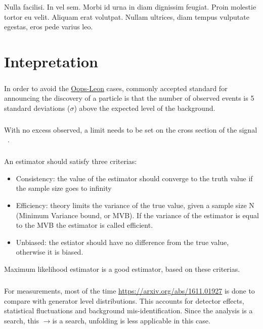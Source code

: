 \begin{savequote}[75mm]
Nulla facilisi. In vel sem. Morbi id urna in diam dignissim feugiat. Proin molestie tortor eu velit. Aliquam erat volutpat. Nullam ultrices, diam tempus vulputate egestas, eros pede varius leo.
\end{savequote}

\chapter{Intepretation}

\paragraph{}
In order to avoid the \href{https://en.wikipedia.org/wiki/Oops-Leon}{Oops-Leon} cases, commonly accepted standard for announcing the discovery of a particle is that the number of observed events is 5 standard deviations ($\sigma$) above the expected level of the background.

\paragraph{}
With no excess observed, a limit needs to be set on the cross section of the signal ~\cite{Stat-asym}. 

\paragraph{}
An estimator should satisfy three criterias:
\begin{itemize}
	\item Consistency: the value of the estimator should converge to the truth value if the sample size goes to infinity
	\item Efficiency: theory limits the variance of the true value, given a sample size N (Minimum Variance bound, or MVB). If the variance of the estimator is equal to the MVB the estimator is called efficient.
	\item Unbiased: the estiator should have no difference from the true value, otherwise it is biased.
\end{itemize}
Maximum likelihood estimator is a good estimator, based on these criterias.

\paragraph{}
For measurements, most of the time \href{unfolding}{https://arxiv.org/abs/1611.01927} is done to compare with generator level distributions. This accounts for detector effects, statistical fluctuations and background mis-identification. Since the analysis is a search, this \hh$\to$\fourb is a search, unfolding is less applicable in this case.
